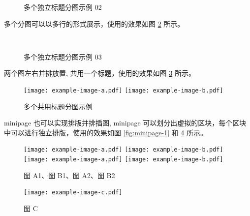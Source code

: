 \documentclass[
    report,     %
    oneside,    %
    UTF8,       %
    zihao=-4    %
]{config} %
\begin{document}
\begin{figure}[H]
    \centering
    \caption{多个独立标题分图示例 02}
    \label{fig:multi-image-02}
\end{figure}
\vspace{-0.7em}  %


多个分图可以以多行的形式展示，使用的效果如图 \ref{fig:multi-image-03} 所示。

\begin{figure}[H]
    \centering
    \\
    \caption{多个独立标题分图示例 03}
    \label{fig:multi-image-03}
\end{figure}
\vspace{-0.7em}  %

两个图左右并排放置, 共用一个标题，使用的效果如图 \ref{fig:multi-image-04} 所示。

\begin{figure}[H]
\centering
    \texttt{[image: example-image-a.pdf]}
    \texttt{[image: example-image-b.pdf]}
    \caption{多个共用标题分图示例}
    \label{fig:multi-image-04}
\end{figure}
\vspace{-0.7em}  %

minipage 也可以实现排版并排插图, minipage 可以划分出虚拟的区块，每个区块中可以进行独立排版，使用的效果如图 \ref{fig:minipage-1} 和  \ref{fig:minipage-2} 所示。

\begin{figure}[H]
    \centering
    
    \begin{minipage}[H]{0.37\linewidth} %
        \centering
        \texttt{[image: example-image-a.pdf]}
        \texttt{[image: example-image-b.pdf]}
        \\
        \texttt{[image: example-image-a.pdf]}
        \texttt{[image: example-image-b.pdf]}
        \caption{图 A1、图 B1、图 A2、图 B2}
        \label{fig:minipage-1}
    \end{minipage}
    \begin{minipage}[H]{0.37\linewidth} %
        \centering
        \texttt{[image: example-image-c.pdf]}
        \caption{图 C}
        \label{fig:minipage-2}
    \end{minipage}
    
\end{figure}
\vspace{-0.7em}  %
\end{document}
